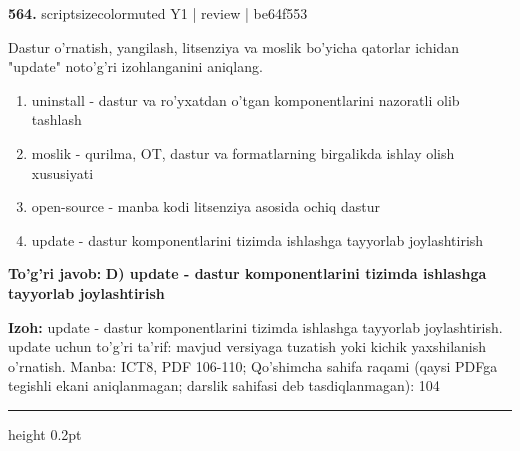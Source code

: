 \documentclass[10pt,a4paper]{article}
\begin{document}
{\bfseries\sffamily\color{ink} 564.} {scriptsizecolor{muted} Y1 | review | be64f553}
\par
Dastur o'rnatish, yangilash, litsenziya va moslik bo'yicha qatorlar ichidan "update" noto'g'ri izohlanganini aniqlang.
\begin{enumerate}[label=\Alph*),leftmargin=9mm]
\item uninstall - dastur va ro'yxatdan o'tgan komponentlarini nazoratli olib tashlash
\item moslik - qurilma, OT, dastur va formatlarning birgalikda ishlay olish xususiyati
\item open-source - manba kodi litsenziya asosida ochiq dastur
\item update - dastur komponentlarini tizimda ishlashga tayyorlab joylashtirish
\end{enumerate}
\begin{tcolorbox}[enhanced,breakable,colback=teal!4,colframe=teal!60!black,boxrule=0.45pt,arc=1.2mm,left=2.7mm,right=2.7mm,top=1.8mm,bottom=1.8mm,before skip=2mm,after skip=2mm]
{\bfseries\sffamily\color{teal}To'g'ri javob:} \textbf{D) update - dastur komponentlarini tizimda ishlashga tayyorlab joylashtirish}
\par\smallskip
{\bfseries Izoh:} update - dastur komponentlarini tizimda ishlashga tayyorlab joylashtirish. update uchun to'g'ri ta'rif: mavjud versiyaga tuzatish yoki kichik yaxshilanish o'rnatish. Manba: ICT8, PDF 106-110; Qo'shimcha sahifa raqami (qaysi PDFga tegishli ekani aniqlanmagan; darslik sahifasi deb tasdiqlanmagan): 104
\end{tcolorbox}
\vspace{2mm}\hrule height 0.2pt\vspace{3mm}
\end{document}
